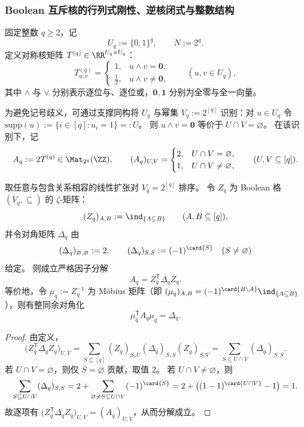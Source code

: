 \subsubsection{Boolean 互斥核的行列式刚性、逆核闭式与整数结构}
固定整数 \(q\ge 2\)，记
\[
U_q:=\{0,1\}^q,\qquad N:=2^q.
\]
定义对称核矩阵 \(T^{(q)}\in\RR^{U_q\times U_q}\)：
\[
T^{(q)}_{u,v}=
\begin{cases}
1,&u\wedge v=\mathbf 0,\\[2pt]
\frac12,&u\wedge v\neq \mathbf 0,
\end{cases}
\qquad (u,v\in U_q),
\]
其中 \(\wedge\) 与 \(\vee\) 分别表示逐位与、逐位或，\(\mathbf 0,\mathbf 1\) 分别为全零与全一向量。

为避免记号歧义，可通过支撑同构将 \(U_q\) 与幂集 \(V_q:=2^{[q]}\) 识别：对 \(u\in U_q\) 令
\(
\mathrm{supp}(u):=\{i\in[q]:u_i=1\}=:U
\)。
则 \(u\wedge v=\mathbf 0\) 等价于 \(U\cap V=\varnothing\)。
在该识别下，记
\[
A_q:=2T^{(q)}\in\Mat_{2^q}(\ZZ),
\qquad
(A_q)_{U,V}=
\begin{cases}
2,&U\cap V=\varnothing,\\
1,&U\cap V\neq \varnothing,
\end{cases}
\qquad (U,V\subseteq[q]).
\]

\begin{proposition}\label{prop:xi-disjointness-boolean-zeta-ldlt}
取任意与包含关系相容的线性扩张对 \(V_q=2^{[q]}\) 排序。
令 \(Z_q\) 为 Boolean 格 \((V_q,\subseteq)\) 的 \(\zeta\)-矩阵：
\[
(Z_q)_{A,B}:=\ind_{\{A\subseteq B\}}\qquad (A,B\subseteq[q]),
\]
并令对角矩阵 \(\Delta_q\) 由
\[
(\Delta_q)_{\varnothing,\varnothing}:=2,
\qquad
(\Delta_q)_{S,S}:=(-1)^{\card{S}}\quad(S\neq\varnothing)
\]
给定。
则成立严格因子分解
\[
A_q=Z_q^{\mathsf T}\Delta_q Z_q.
\]
等价地，令 \(\mu_q:=Z_q^{-1}\) 为 Möbius 矩阵（即
\(
(\mu_q)_{A,B}=(-1)^{\card{B\setminus A}}\ind_{\{A\subseteq B\}}
\)），则有整同余对角化
\[
\mu_q^{\mathsf T}A_q\mu_q=\Delta_q.
\]
\end{proposition}
\begin{proof}
由定义，
\[
\bigl(Z_q^{\mathsf T}\Delta_q Z_q\bigr)_{U,V}
=\sum_{S\subseteq[q]}(Z_q)_{S,U}(\Delta_q)_{S,S}(Z_q)_{S,V}
=\sum_{S\subseteq U\cap V}(\Delta_q)_{S,S}.
\]
若 \(U\cap V=\varnothing\)，则仅 \(S=\varnothing\) 贡献，取值 \(2\)。
若 \(U\cap V\neq\varnothing\)，则
\[
\sum_{S\subseteq U\cap V}(\Delta_q)_{S,S}
=2+\sum_{\varnothing\neq S\subseteq U\cap V}(-1)^{\card{S}}
=2+\bigl((1-1)^{\card{U\cap V}}-1\bigr)=1.
\]
故逐项有 \(\bigl(Z_q^{\mathsf T}\Delta_q Z_q\bigr)_{U,V}=(A_q)_{U,V}\)，从而分解成立。
\end{proof}

